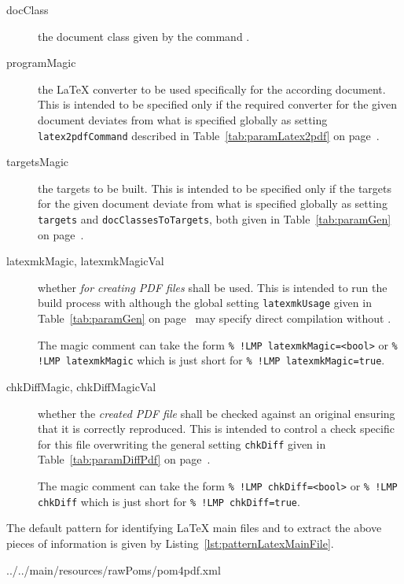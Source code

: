 \begin{description}
  \item[docClass]
  the document class given by the command . 
  \item[programMagic]
  the \LaTeX{} converter to be used 
  specifically for the according document. 
  This is intended to be specified only 
  if the required converter for the given document deviates 
  from what is specified 
  globally as setting \texttt{latex2pdfCommand} described in 
  Table~\ref{tab:paramLatex2pdf} on page~\pageref{tab:paramLatex2pdf}. 
  \item[targetsMagic]
  the targets to be built. 
  This is intended to be specified only 
  if the targets for the given document deviate from what is specified 
  globally as setting \texttt{targets} and \texttt{docClassesToTargets}, 
  both given in 
  Table~\ref{tab:paramGen} on page~\pageref{tab:paramGen}. 
  \item[latexmkMagic, latexmkMagicVal] 
  whether \emph{for creating PDF files}  shall be used. 
  This is intended to run the build process with  
  although the global setting \texttt{latexmkUsage} 
  given in Table~\ref{tab:paramGen} on page~\pageref{tab:paramGen} 
  may specify direct compilation without . 

  The magic comment can take the form \texttt{\% !LMP latexmkMagic=<bool>} %
  or \texttt{\% !LMP latexmkMagic} which is just short for \texttt{\% !LMP latexmkMagic=true}. %

  \item[chkDiffMagic, chkDiffMagicVal]
  whether the \emph{created PDF file} shall be checked against an original 
  ensuring that it is correctly reproduced. 
  This is intended to control a check specific for this file 
  overwriting the general setting \texttt{chkDiff} 
  given in Table~\ref{tab:paramDiffPdf} on page~\pageref{tab:paramDiffPdf}. 

  The magic comment can take the form \texttt{\% !LMP chkDiff=<bool>} %
  or \texttt{\% !LMP chkDiff} which is just short for \texttt{\% !LMP chkDiff=true}. %
\end{description}

The default pattern for identifying \LaTeX{} main files 
and to extract the above pieces of information 
is given by Listing~\ref{lst:patternLatexMainFile}. 



{../../main/resources/rawPoms/pom4pdf.xml}%

